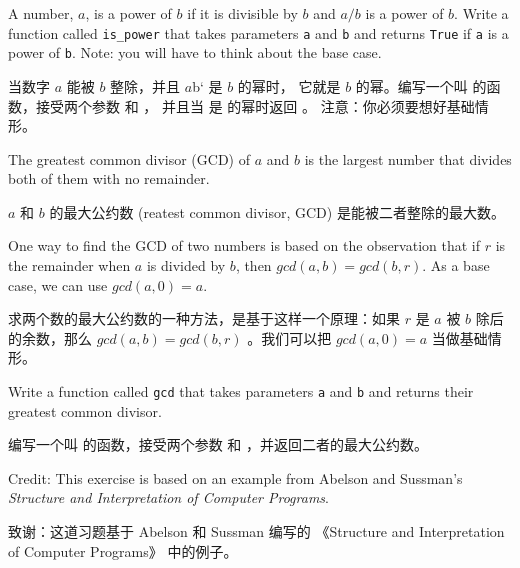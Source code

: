 \begin{exercise}

A number, $a$, is a power of $b$ if it is divisible by $b$
and $a/b$ is a power of $b$.  Write a function called
\verb"is_power" that takes parameters {\tt a} and {\tt b}
and returns {\tt True} if {\tt a} is a power of {\tt b}.
Note: you will have to think about the base case.

当数字 $a$ 能被  $b$ 整除，并且 $a$b` 是 $b$ 的幂时， 它就是 $b$ 的幂。编写一个叫  的函数，接受两个参数  和 ， 并且当  是  的幂时返回 。
注意：你必须要想好基础情形。

\end{exercise}

\begin{exercise}
  

The greatest common divisor (GCD) of $a$ and $b$ is the largest number
that divides both of them with no remainder.

$a$ 和 $b$ 的最大公约数 (reatest common divisor, GCD) 是能被二者整除的最大数。

One way to find the GCD of two numbers is based on the observation
that if $r$ is the remainder when $a$ is divided by $b$, then $gcd(a,
b) = gcd(b, r)$.  As a base case, we can use $gcd(a, 0) = a$.

求两个数的最大公约数的一种方法，是基于这样一个原理：如果 $r$ 是 $a$ 被 $b$ 除后的余数，那么  $gcd(a,b) = gcd(b, r)$ 。我们可以把 $gcd(a, 0) = a$ 当做基础情形。

Write a function called
\verb"gcd" that takes parameters {\tt a} and {\tt b}
and returns their greatest common divisor.

编写一个叫  的函数，接受两个参数  和 ，并返回二者的最大公约数。

Credit: This exercise is based on an example from Abelson and
Sussman's {\em Structure and Interpretation of Computer Programs}.

致谢：这道习题基于 Abelson 和 Sussman 编写的 《Structure and Interpretation of Computer Programs》 中的例子。

\end{exercise}
